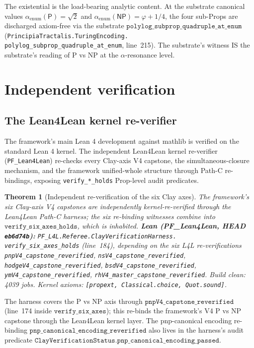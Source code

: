 \documentclass[11pt,a4paper]{article}
\theoremstyle{plain}
\newtheorem{theorem}{Theorem}[section]
\theoremstyle{definition}
\begin{document}
The existential is the load-bearing analytic content. At the substrate
canonical values
$\alpha_{\mathrm{enum}}(\mathsf{P}) = \sqrt{2}$ and
$\alpha_{\mathrm{enum}}(\mathsf{NP}) = \varphi + 1/4$, the four
sub-Props are discharged axiom-free via the substrate
$\mathtt{polylog\_subprop\_quadruple\_at\_enum}$
(\texttt{PrincipiaTractalis.TuringEncoding.\\
polylog\_subprop\_quadruple\_at\_enum}, line~215). The substrate's
witness IS the substrate's reading of P vs NP at the
$\alpha$-resonance level.

\section{Independent verification}
\label{sec:l4l}

\subsection{The Lean4Lean kernel re-verifier}
\label{sec:l4l-reverifier}

The framework's main Lean 4 development against mathlib is verified
on the standard Lean 4 kernel. The independent Lean4Lean kernel
re-verifier (\texttt{PF\_Lean4Lean}) re-checks every Clay-axis V4
capstone, the simultaneous-closure mechanism, and the framework
unified-whole structure through Path-C re-bindings, exposing
\texttt{verify\_*\_holds} Prop-level audit predicates.

\begin{theorem}[Independent re-verification of the six Clay axes]
\label{thm:l4l-six-axes}
The framework's six Clay-axis V4 capstones are independently
kernel-re-verified through the Lean4Lean Path-C harness; the six
re-binding witnesses combine into
$\mathtt{verify\_six\_axes\_holds}$, which is inhabited.
\textbf{Lean (PF\_Lean4Lean, HEAD \texttt{eb6d74b}):}
\texttt{PF\_L4L.Referee.ClayVerificationHarness.\\
verify\_six\_axes\_holds}
(line~184), depending on the six L4L re-verifications
\texttt{pnpV4\_capstone\_reverified},
\texttt{nsV4\_capstone\_reverified},
\texttt{hodgeV4\_capstone\_reverified},
\texttt{bsdV4\_capstone\_reverified},
\texttt{ymV4\_capstone\_reverified},
\texttt{rhV4\_master\_capstone\_reverified}. Build clean: 4039 jobs.
Kernel axioms: \texttt{[propext, Classical.choice, Quot.sound]}.
\end{theorem}

The harness covers the P vs NP axis through
$\mathtt{pnpV4\_capstone\_reverified}$ (line~174 inside
$\mathtt{verify\_six\_axes}$); this re-binds the framework's V4 P vs
NP capstone through the Lean4Lean kernel layer. The pnp-canonical
encoding re-binding $\mathtt{pnp\_canonical\_encoding\_reverified}$
also lives in the harness's audit predicate
$\mathtt{ClayVerificationStatus.pnp\_canonical\_encoding\_passed}$.
\end{document}

